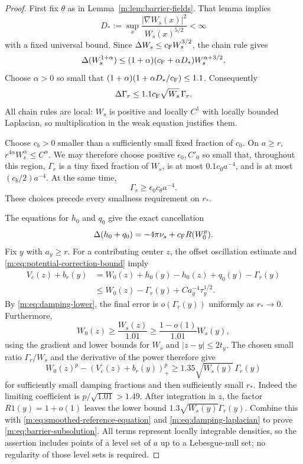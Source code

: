 \begin{proof}
First fix $\theta$ as in Lemma~\ref{m:lem:barrier-fields}.  That lemma
implies
\[
 D_*:=\sup_x\frac{|\nabla W_s(x)|^2}{W_s(x)^{5/2}}<\infty
\]
with a fixed universal bound.  Since
$\Delta W_s\le c_{\mathrm F} W_s^{3/2}$, the chain rule gives
\[
 \Delta(W_s^{1+\alpha})
 \le(1+\alpha)(c_{\mathrm F}+\alpha D_*)W_s^{\alpha+3/2}.
\]
Choose $\alpha>0$ so small that
$(1+\alpha)(1+\alpha D_*/c_{\mathrm F})\le1.1$.  Consequently
\begin{equation}\label{m:eq:damping-laplacian}
 \Delta\Gamma_r\le1.1c_{\mathrm F}\sqrt{W_s}\,\Gamma_r.
\end{equation}
All chain rules are local: $W_s$ is positive and locally $C^1$ with
locally bounded Laplacian, so multiplication in the weak equation
justifies them.

Choose $c_b>0$ smaller than a sufficiently small fixed fraction of
$c_0$.  On $a\ge r$,
$r^{4\alpha}W_s^\alpha\le C^\alpha$.  We may therefore choose positive
$\epsilon_0,C'_0$ so small that, throughout this region, $\Gamma_r$
is a tiny fixed fraction of $W_s$, is at most $0.1c_0a^{-4}$, and is
at most $(c_b/2)a^{-4}$.  At the same time,
\begin{equation}\label{m:eq:damping-lower}
 \Gamma_r\ge\epsilon_0c_\theta a^{-4}.
\end{equation}
These choices precede every smallness requirement on $r_*$.

The equations for $h_0$ and $q_0$ give the exact cancellation
\begin{equation}\label{m:eq:smoothed-reference-equation}
 \Delta(h_0+q_0)=-4\pi\nu_s+c_{\mathrm F} R(W_0^p).
\end{equation}
Fix $y$ with $a_y\ge r$.  For a contributing center $z$, the offset
oscillation estimate and \eqref{m:eq:potential-correction-bound} imply
\begin{align*}
 V_c(z)+b_r(y)
 &=W_0(z)+h_0(y)-h_0(z)+q_0(y)-\Gamma_r(y)\\
 &\le W_0(z)-\Gamma_r(y)+Ca_y^{-4}\tau_y^{1/2}.
\end{align*}
By \eqref{m:eq:damping-lower}, the final error is $o(\Gamma_r(y))$
uniformly as $r_*\to0$.  Furthermore,
\[
 W_0(z)\ge\frac{W_s(z)}{1.01}
      \ge\frac{1-o(1)}{1.01}W_s(y),
\]
using the gradient and lower bounds for $W_s$ and $|z-y|\le2t_y$.
The chosen small ratio $\Gamma_r/W_s$ and the derivative of the power
therefore give
\[
 W_0(z)^p-(V_c(z)+b_r(y))_+^p
       \ge 1.35\sqrt{W_s(y)}\,\Gamma_r(y)
\]
for sufficiently small damping fractions and then sufficiently small
$r_*$.  Indeed the limiting coefficient is
$p/\sqrt{1.01}>1.49$.  After integration in $z$, the factor
$R1(y)=1+o(1)$ leaves the lower bound
$1.3\sqrt{W_s(y)}\Gamma_r(y)$.  Combine this with
\eqref{m:eq:smoothed-reference-equation} and
\eqref{m:eq:damping-laplacian} to prove
\eqref{m:eq:barrier-subsolution}.  All terms represent locally integrable
densities, so the assertion includes points of a level set of $a$ up
to a Lebesgue-null set; no regularity of those level sets is required.


\end{proof}
